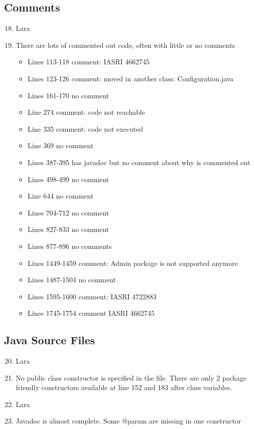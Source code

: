 \subsection{Comments}
\begin{enumerate}
	\setcounter{enumi}{17}
	\item Lara
	\item There are lots of commented out code, often with little or no comments
	\begin{itemize}
		\item Lines 113-118 comment: IASRI 4662745
		\item Lines 123-126 comment: moved in another class: Configuration.java
		\item Lines 161-170 no comment
		\item Line 274 comment: code not reachable
		\item Line 335 comment: code not executed
		\item Line 369 no comment
		\item Lines 387-395 has javadoc but no comment about why is commented out
		\item Lines 498-499 no comment
		\item Line 644 no comment
		\item Lines 704-712 no comment
		\item Lines 827-833 no comment
		\item Lines 877-896 no comments
		\item Lines 1449-1459 comment: Admin package is not supported anymore
		\item Lines 1487-1504 no comment
		\item Lines 1595-1600 comment: IASRI 4722883
		\item Lines 1745-1754 comment IASRI 4662745
	\end{itemize}
\end{enumerate}
\subsection{Java Source Files}
\begin{enumerate}
	\setcounter{enumi}{19}
	\item Lara
	\item No public class constructor is specified in the file. There are only 2 package friendly constructors available at line 152 and 183 after class variables.
	\item Lara
	\item Javadoc is almost complete. Some @param are missing in one constructor
\end{enumerate}
